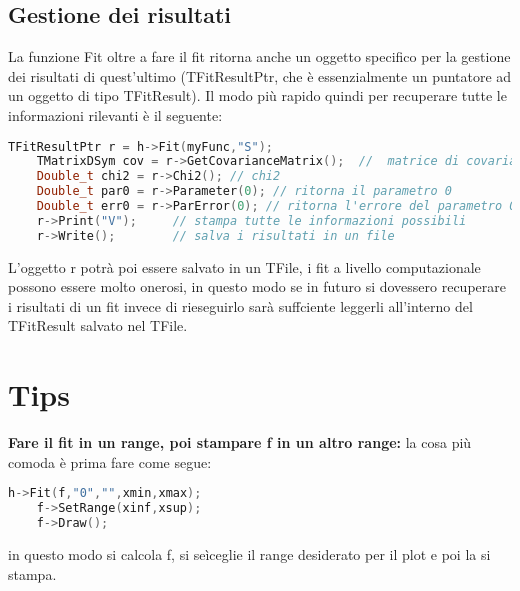 \subsection{Gestione dei risultati}
La funzione Fit oltre a fare il fit ritorna anche un oggetto specifico per la gestione dei risultati di quest'ultimo (TFitResultPtr, che è essenzialmente un puntatore ad un oggetto di tipo TFitResult). Il modo più rapido quindi per recuperare tutte le informazioni rilevanti è il seguente:
\begin{lstlisting}[language=C++,label={cod1},mathescape=true,breaklines=true]
	TFitResultPtr r = h->Fit(myFunc,"S");
	TMatrixDSym cov = r->GetCovarianceMatrix();  //  matrice di covarianza
	Double_t chi2 = r->Chi2(); // chi2
	Double_t par0 = r->Parameter(0); // ritorna il parametro 0
	Double_t err0 = r->ParError(0); // ritorna l'errore del parametro 0
	r->Print("V");     // stampa tutte le informazioni possibili
	r->Write();        // salva i risultati in un file
\end{lstlisting}
L'oggetto r potrà poi essere salvato in un TFile, i fit a livello computazionale possono essere molto onerosi, in questo modo se in futuro si dovessero recuperare i risultati di un fit invece di rieseguirlo sarà suffciente leggerli all'interno del TFitResult salvato nel TFile.
\section{Tips}
\textbf{Fare il fit in un range, poi stampare f in un altro range:} la cosa più comoda è prima fare come segue:
\begin{lstlisting}[language=C++,label={cod1},mathescape=true,breaklines=true]
	h->Fit(f,"0","",xmin,xmax);
	f->SetRange(xinf,xsup);
	f->Draw();
\end{lstlisting}
in questo modo si calcola f, si seìceglie il range desiderato per il plot e poi la si stampa.